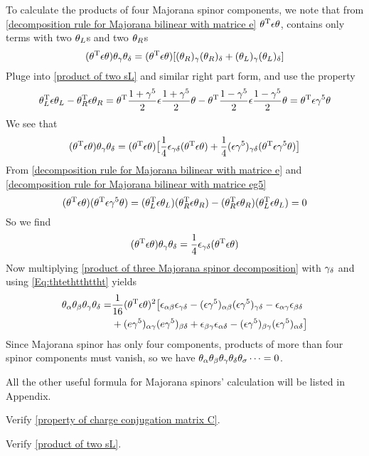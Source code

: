 To calculate the products of four Majorana spinor components, we note that from \eqref{decomposition rule for Majorana bilinear with matrice e} $\theta^{\text{T}}\epsilon\theta$, contains only terms with two $\theta_L$s and two $\theta_R$s
\begin{equation}
    (\theta^{\text{T}}\epsilon\theta)\theta_\gamma \theta_\delta
    =(\theta^{\text{T}}\epsilon\theta)[(\theta_R)_\gamma(\theta_R)_\delta + (\theta_L)_\gamma(\theta_L)_\delta]
\end{equation}
Pluge into \eqref{product of two sL} and similar right part form, and use the property
\begin{equation}\label{decomposition rule for Majorana bilinear with matrice eg5}
   \theta_L^{\text{T}}\epsilon\theta_L - \theta_R^{\text{T}}\epsilon\theta_R 
   = \theta^{\text{T}}\frac{1+\gamma^5}{2}\epsilon
   \frac{1+\gamma^5}{2}\theta
   -\theta^{\text{T}}\frac{1-\gamma^5}{2}\epsilon
   \frac{1-\gamma^5}{2}\theta
   = \theta^{\text{T}} \epsilon \gamma^5 \theta
\end{equation}
We see that
\begin{equation}
    (\theta^{\text{T}}\epsilon\theta)\theta_\gamma \theta_\delta
    =(\theta^{\text{T}}\epsilon\theta)
    \big[
    \frac{1}{4}\epsilon_{\gamma\delta}
    (\theta^{\text{T}}\epsilon\theta)
    +\frac{1}{4}(\epsilon\gamma^5)_{\gamma\delta}
    (\theta^{\text{T}} \epsilon \gamma^5 \theta)
    \big]
\end{equation}
From \eqref{decomposition rule for Majorana bilinear with matrice e} and \eqref{decomposition rule for Majorana bilinear with matrice eg5}
\begin{equation}
   (\theta^{\text{T}}\epsilon\theta)(\theta^{\text{T}} \epsilon \gamma^5 \theta)
   = (\theta_L^{\text{T}}\epsilon\theta_L)
   (\theta_R^{\text{T}}\epsilon\theta_R)
   -(\theta_R^{\text{T}}\epsilon\theta_R)
   (\theta_L^{\text{T}}\epsilon\theta_L)
   =0
\end{equation}
So we find
\begin{equation}\label{Eq:thtethtthttht}
  (\theta^{\text{T}}\epsilon\theta)\theta_\gamma \theta_\delta
  =\frac{1}{4}
  \epsilon_{\gamma\delta}
  (\theta^{\text{T}}\epsilon\theta)
\end{equation}
Now multiplying \eqref{product of three Majorana spinor decomposition} with $\gamma_\delta$ and using \eqref{Eq:thtethtthttht}
yields
\begin{align}\label{product of the four Majorana spinor decompositon}
   \theta_\alpha\theta_\beta\theta_\gamma\theta_\delta
   =&\frac{1}{16}(\theta^{\text{T}}\epsilon\theta)^2
   \big[
     \epsilon_{\alpha\beta}\epsilon_{\gamma\delta}
     -(\epsilon\gamma^5)_{\alpha\beta}(\epsilon\gamma^5)_{\gamma\delta}
     -\epsilon_{\alpha\gamma}\epsilon_{\beta\delta}\notag\\
     &+(e\gamma^5)_{\alpha\gamma}(e\gamma^5)_{\beta\delta}
     +\epsilon_{\beta\gamma}\epsilon_{\alpha\delta}
     -(\epsilon\gamma^5)_{\beta\gamma}(\epsilon\gamma^5)_{\alpha\delta}
   \big]
\end{align}
Since  Majorana spinor has only four components, products of more than four spinor components must vanish, so we have $\theta_\alpha\theta_\beta\theta_\gamma\theta_\delta\theta_\sigma \cdots = 0$.

All the other useful formula for Majorana spinors' calculation will be listed in Appendix.

\begin{Exe}
	Verify \eqref{property of charge conjugation matrix C}.
\end{Exe}

\begin{Exe} \label{Exe: product of two sL}
	Verify \eqref{product of two sL}.
\end{Exe}
